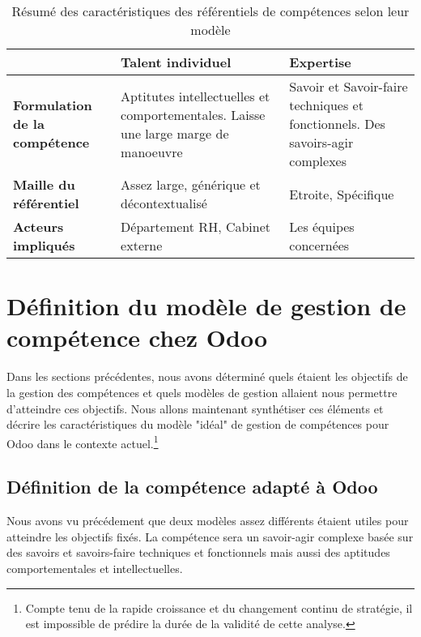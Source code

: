 \begin{table}[H]
  \caption{Résumé des caractéristiques des référentiels de compétences selon leur modèle}
  \label{model_comp}

  \begin{center}
    \begin{tabular}{p{}p{}p{}}
      & \textbf{Talent individuel} & \textbf{Expertise} \\
      \hline
      \textbf{Formulation de la compétence} & Aptitutes intellectuelles et comportementales. Laisse une large marge de manoeuvre & Savoir et Savoir-faire techniques et fonctionnels. Des savoirs-agir complexes\\
      \textbf{Maille du référentiel} & Assez large, générique et décontextualisé & Etroite, Spécifique\\
      \textbf{Acteurs impliqués}  & Département RH, Cabinet externe &  Les équipes concernées\\
  
    \end{tabular}
  \end{center}
\end{table}

\section{Définition du modèle de gestion de compétence chez Odoo}
Dans les sections précédentes, nous avons déterminé quels étaient les objectifs de la gestion des compétences et quels modèles de gestion allaient nous permettre d'atteindre ces objectifs. Nous allons maintenant synthétiser ces éléments et décrire les caractéristiques du modèle "idéal" de gestion de compétences pour Odoo dans le contexte actuel.\footnote{Compte tenu de la rapide croissance et du changement continu de stratégie, il est impossible de prédire la durée de la validité de cette analyse.} 

\subsection{Définition de la compétence adapté à Odoo}
Nous avons vu précédement que deux modèles assez différents étaient utiles pour atteindre les objectifs fixés. La compétence sera un savoir-agir complexe basée sur des savoirs et savoirs-faire techniques et fonctionnels mais aussi des aptitudes comportementales et intellectuelles. 

